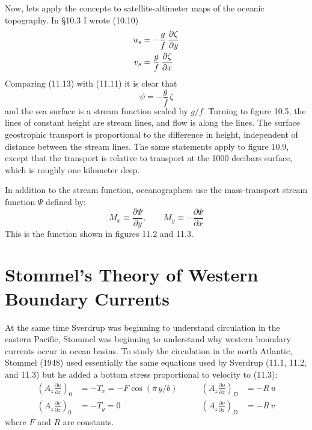 Now, lets apply the concepts to satellite-altimeter maps of the
oceanic topography. In \S 10.3 I wrote (10.10)
\vspace{-1.5ex}
\begin{align}
u_s &= -\frac{g}{f}\,\frac{\partial{\zeta}}{\partial{y}} \notag \\
v_s &= \frac{g}{f}\,\frac{\partial{\zeta}}{\partial{x}}
\end{align}
Comparing (11.13) with (11.11) it is clear that
\begin{equation}
\psi = -\frac{g}{f}\,\zeta
\end{equation}
and the sea surface is a stream function scaled by $g/f$. Turning to
figure 10.5, the lines of constant height are stream lines, and flow
is along the lines. The surface geostrophic
transport is proportional to the difference in height, independent of
distance between the stream lines.  The same statements apply to
figure 10.9, except that the transport
is relative to transport at the 1000 decibars surface, which is
roughly one kilometer deep.

In addition to the stream function, oceanographers use the
mass-transport stream function $\Psi$
defined by:
\begin{equation}
M_x \equiv \frac{\partial{\Psi}}{\partial{y}}, \qquad M_y \equiv -
\frac{\partial{\Psi}}{\partial{x}}
\end{equation}
This is the function shown in figures 11.2 and 11.3.

\section[Western Boundary Currents]{Stommel's Theory of Western Boundary Currents}
At the same time Sverdrup was beginning to understand
circulation in the eastern Pacific, Stommel was beginning to
understand why western boundary currents occur in ocean basins. To
study the circulation in the north Atlantic, Stommel (1948) used
essentially the same equations used by Sverdrup (11.1, 11.2, and 11.3)
but he added a bottom stress proportional to velocity to (11.3):
\begin{subequations}
\begin{alignat}{2}
\left(A_z \frac{\partial{u}}{\partial{z}}\right)_0 &= -T_x =-F\cos(\pi \,y/b)& \qquad \left(A_z \frac{\partial{u}}{\partial{z}}\right)_D &= -R\,u \\
\left(A_z \frac{\partial{v}}{\partial{z}}\right)_0 &= -T_y =0 & \qquad \left(A_z \frac{\partial{v}}{\partial{z}}\right)_D &= -R\,v
\end{alignat}
\end{subequations}
where $F$ and $R$ are constants.

